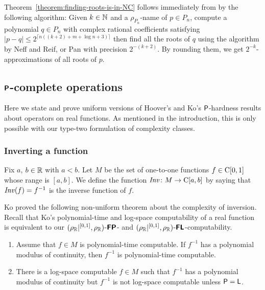 \documentclass[envcountsame,orivec,oribibl]{llncs}
\begin{document}

Theorem~\ref{theorem:finding-roots-is-in-NC} follows immediately from
by the following algorithm:
Given $k \in \mathbb N$ and a $\rho_{P_n}$-name of $p \in P_n$, 
compute a polynomial $q \in {P_n}$ with complex rational coefficients
satisfying $|p - q| \le 2^{\lceil n((k+2) + m + \log n + 3)\rceil}$
then find all the roots of $q$ using the algorithm by Neff and Reif, or Pan
with precision $2^{-(k+2)}$.
By rounding them, we get $2^{-k}$-approximations of all roots of $p$.

\subsection{$\text{\bfseries \sffamily \upshape P}$-complete operations}
\label{section:P-complete}

Here we state and prove uniform versions of 
Hoover's and Ko's $\mathsf{P}$-hardness results 
about operators on real functions. 
As mentioned in the introduction, 
this is only possible with our type-two formulation of complexity classes. 

\subsubsection{Inverting a function}

Fix $a$, $b \in \mathbb R$ with $a < b$. 
Let $M$ be the set of one-to-one functions $f \in \mathrm C[0,1]$
whose range is $[a,b]$.
We define the function $\mathit{Inv} \colon M \to \mathrm C [a, b]$ 
by saying that $\mathit{Inv} (f) = f ^{-1}$ is the inverse function of $f$. 

Ko proved the following non-uniform theorem about the complexity of inversion.
Recall that Ko's polynomial-time and log-space computability of a real function
is equivalent to our $(\rho _\mathbb R|^{[0,1]}, \rho _\mathbb R)$-$\text{\bfseries \sffamily \upshape FP}$- and $(\rho _\mathbb R|^{[0,1]}, \rho _\mathbb R)$-$\text{\bfseries \sffamily \upshape FL}$-computability. 

\begin{theorem}
\label{theorem: ko inversion}
\begin{enumerate}
\item \label{enumi:ko1991-4.7}
Assume that $f \in M$ is polynomial-time computable. 
If $f^{-1}$ has a polynomial modulus of continuity, 
then $f^{-1}$ is polynomial-time computable.
\item \label{enumi:ko1991-4.18}
There is a log-space computable $f \in M$
such that $f^{-1}$ has a polynomial modulus of continuity
but $f^{-1}$ is not log-space computable
unless $\mathsf{P} = \mathsf{L}$.
\end{enumerate}
\end{theorem}
\end{document}
